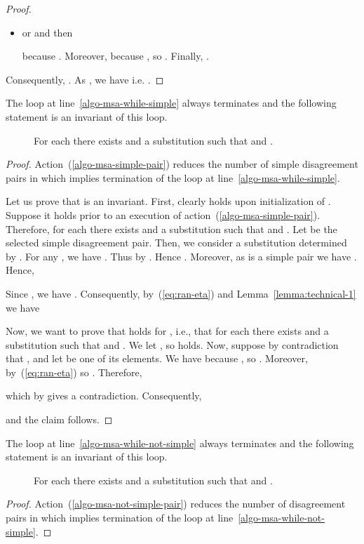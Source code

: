 \documentclass[fleqn]{tlp}
\begin{document}
\begin{appendix}
\begin{proof}
\begin{itemize}
  \item or  and then
    
    because .
    Moreover,  because
    ,
    so .
    Finally, .
  \end{itemize}
  Consequently, .
  As , we have 
  i.e. .
\end{proof}

\begin{proposition}\label{proposition:invariant-correction-algo-pos-1}
  The loop at line~\ref{algo-msa-while-simple} always terminates
  and the following statement is an invariant of this loop.
  \begin{description}
  \item[] For each  there exists 
     and a substitution  such that
     and
    . 
  \end{description}
\end{proposition}
\begin{proof}
  Action~(\ref{algo-msa-simple-pair})
  reduces the number of simple disagreement pairs in
   which implies termination of the 
  loop at line~\ref{algo-msa-while-simple}.

  Let us prove that  is an invariant.
  First,  clearly holds upon initialization
  of . Suppose it holds prior to an execution of
  action~(\ref{algo-msa-simple-pair}).
  Therefore, for each  there exists 
     and a substitution  such that
     and
    .
Let  be the selected simple disagreement pair.
  Then, we consider a substitution 
  determined by . For any ,
  we have . 
  Thus  by .
Hence
  .
  Moreover, as  is a simple pair we have
  . Hence,
  
Since , we have .
  Consequently, by~(\ref{eq:ran-eta}) and
  Lemma~\ref{lemma:technical-1} we have
  
Now, we want to prove that  holds for ,
  i.e., that for each  there exists 
     and a substitution  such that
     and
    .
We let , so  holds.
Now, suppose by contradiction that
  , and let  be one of its elements.
  We have  because
  , so
  .
  Moreover,  by~(\ref{eq:ran-eta}) so
  . Therefore,
  
  which by  gives a contradiction.
  Consequently, 
  
  and the claim follows.
\end{proof}

\begin{proposition}\label{proposition:invariant-correction-algo-pos-2}
  The loop at line~\ref{algo-msa-while-not-simple} always terminates
  and the following statement is an invariant of this loop.
  \begin{description}
  \item[] For each  there exists 
     and a substitution  such that
     and
    .
  \end{description}
\end{proposition}
\begin{proof}
  Action~(\ref{algo-msa-not-simple-pair})
  reduces the number of disagreement pairs in
   which implies termination of the 
  loop at line~\ref{algo-msa-while-not-simple}.


\end{proof}
\end{appendix}
\end{document}
